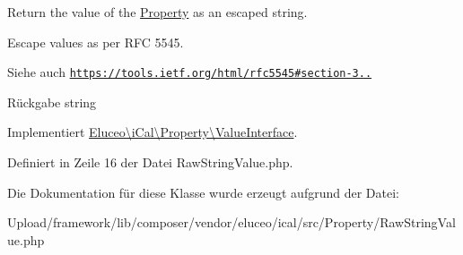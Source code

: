 Return the value of the \mbox{\hyperlink{class_eluceo_1_1i_cal_1_1_property}{Property}} as an escaped string.

Escape values as per R\+FC 5545.

\begin{DoxySeeAlso}{Siehe auch}
\href{https://tools.ietf.org/html/rfc5545#section-3.3.11}{\tt https\+://tools.\+ietf.\+org/html/rfc5545\#section-\/3..}
\end{DoxySeeAlso}
\begin{DoxyReturn}{Rückgabe}
string 
\end{DoxyReturn}


Implementiert \mbox{\hyperlink{interface_eluceo_1_1i_cal_1_1_property_1_1_value_interface_a408412ae5d11fd3f239c7985aede8c32}{Eluceo\textbackslash{}i\+Cal\textbackslash{}\+Property\textbackslash{}\+Value\+Interface}}.



Definiert in Zeile 16 der Datei Raw\+String\+Value.\+php.



Die Dokumentation für diese Klasse wurde erzeugt aufgrund der Datei\+:\begin{DoxyCompactItemize}
\item 
Upload/framework/lib/composer/vendor/eluceo/ical/src/\+Property/Raw\+String\+Value.\+php\end{DoxyCompactItemize}

